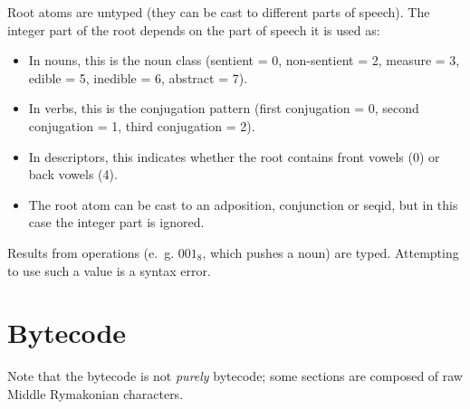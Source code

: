 \documentclass{book}
\newcommand{\lname}{Middle Rymakonian}
\begin{document}
Root atoms are untyped (they can be cast to different parts of speech). The integer part of the root depends on the part of speech it is used as:

\begin{itemize}
    \item In nouns, this is the noun class (sentient = 0, non-sentient = 2, measure = 3, edible = 5, inedible = 6, abstract = 7).
    \item In verbs, this is the conjugation pattern (first conjugation = 0, second conjugation = 1, third conjugation = 2).
    \item In descriptors, this indicates whether the root contains front vowels (0) or back vowels (4).
    \item The root atom can be cast to an adposition, conjunction or seqid, but in this case the integer part is ignored.
\end{itemize}

Results from operations (e.~g. $001_8$, which pushes a noun) are typed. Attempting to use such a value is a syntax error.

\section{Bytecode}

\newcommand{\push}{\text{push}}
\newcommand{\pop}{\text{pop}}

Note that the bytecode is not \emph{purely} bytecode; some sections are composed of raw \lname{} characters.
\end{document}
